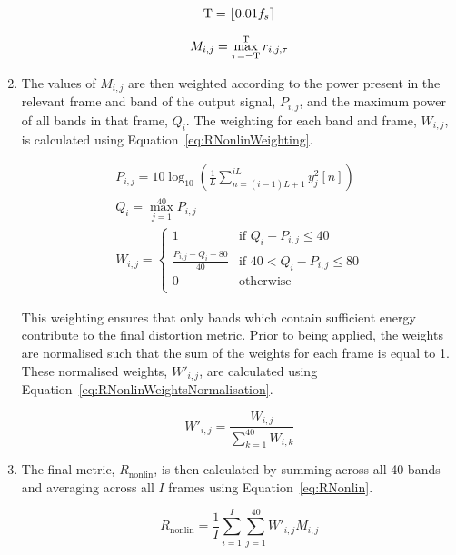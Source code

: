 \begin{enumerate}
					\begin{gather}
						\mathrm{T} = \left\lfloor0.01f_{s}\right\rceil \nonumber \\[0.6em]
						M_{i,j} = \max_{\tau = -\mathrm{T}}^{\mathrm{T}} r_{i,j,\tau}
						\label{eq:RNonlinMaxCrossCorrelation}
					\end{gather}

				\item The values of $M_{i,j}$ are then weighted according to the power present in the
					relevant frame and band of the output signal, $P_{i,j}$, and the maximum power of
					all bands in that frame, $Q_{i}$. The weighting for each band and frame, $W_{i,j}$,
					is calculated using Equation~\ref{eq:RNonlinWeighting}.

					\begin{gather}
						P_{i,j} = 10\log_{10} \left( \frac{1}{L} 
							\sum_{n=(i-1)L+1}^{iL} y_{j}^{2}[n]\right) \nonumber \\[0.6em]
						Q_{i} = \max_{j = 1}^{40} P_{i,j} \nonumber \\[0.6em]
						W_{i,j} = \begin{cases}
							1 & \text{if $Q_{i} - P_{i,j} \leq 40$} \\
							\frac{P_{i,j} - Q_{i} + 80}{40} & 
								\text{if $40 < Q_{i} - P_{i,j} \leq 80$} \\
							0 & \text{otherwise} \\
						\end{cases}
						\label{eq:RNonlinWeighting}
					\end{gather}

					This weighting ensures that only bands which contain sufficient energy contribute
					to the final distortion metric. Prior to being applied, the weights are normalised
					such that the sum of the weights for each frame is equal to 1. These normalised
					weights, $W'_{i,j}$, are calculated using
					Equation~\ref{eq:RNonlinWeightsNormalisation}.

					\begin{equation}
						W'_{i,j} = \frac{W_{i, j}}{\sum_{k = 1}^{40} W_{i,k}}
						\label{eq:RNonlinWeightsNormalisation}
					\end{equation}

				\item The final metric, $R_{\mathrm{nonlin}}$, is then calculated by summing across all 40
					bands and averaging across all $I$ frames using Equation~\ref{eq:RNonlin}.

					\begin{equation}
						R_{\mathrm{nonlin}} = \frac{1}{I} \sum_{i = 1}^{I} \sum_{j = 1}^{40} 
									W'_{i,j}M_{i,j}
						\label{eq:RNonlin}
					\end{equation}

			\end{enumerate}

